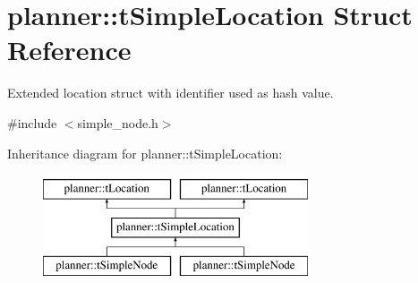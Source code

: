 \hypertarget{structplanner_1_1t_simple_location}{}\section{planner\+:\+:t\+Simple\+Location Struct Reference}
\label{structplanner_1_1t_simple_location}


Extended location struct with identifier used as hash value.  




{\ttfamily \#include $<$simple\+\_\+node.\+h$>$}

Inheritance diagram for planner\+:\+:t\+Simple\+Location\+:\begin{figure}[H]
\begin{center}
\leavevmode
\includegraphics[height=3.000000cm]{structplanner_1_1t_simple_location}
\end{center}
\end{figure}
